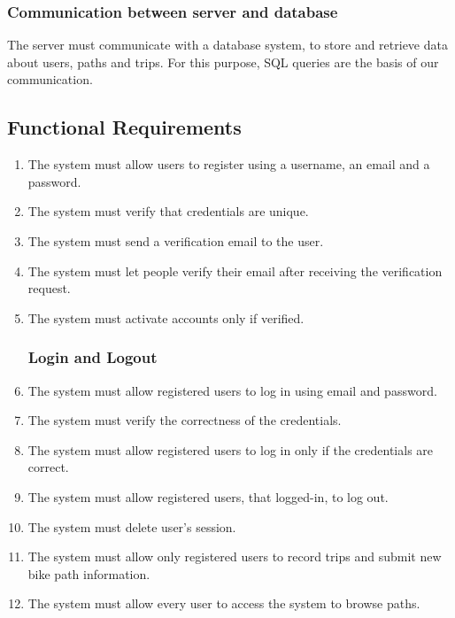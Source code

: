 \subsubsection*{Communication between server and database}
The server must communicate with a database system, to store and retrieve data about users, paths and trips. For this purpose, SQL queries are the basis of our communication.

\subsection{Functional Requirements}

\begin{enumerate}[label=•  R\arabic*:]

\subsubsection*{Sign up}

    \item The system must allow users to register using a username, an email and a password.
    \item The system must verify that credentials are unique.
    \item The system must send a verification email to the user.
    \item The system must let people verify their email after receiving the verification request.
    \item The system must activate accounts only if verified.

\subsubsection*{Login and Logout}
    \item The system must allow registered users to log in using email and password.
    \item The system must verify the correctness of the credentials.
    \item The system must allow registered users to log in only if the credentials are correct.
    \item The system must allow registered users, that logged-in, to log out.
    \item The system must delete user's session.
    \item The system must allow only registered users to record trips and submit new bike path information.
    \item The system must allow every user to access the system to browse paths.


\end{enumerate}
